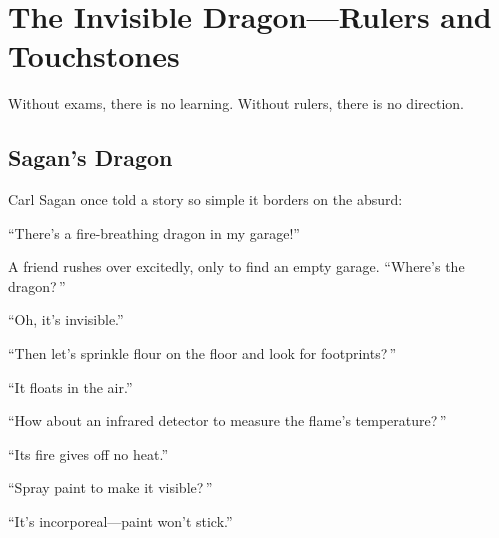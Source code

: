 

\chapter{The Invisible Dragon---Rulers and Touchstones}

\begin{myquote}
Without exams, there is no learning. Without rulers, there is no direction.
\end{myquote}

\section{Sagan's Dragon}

Carl Sagan once told a story so simple it borders on the absurd:

\begin{myquote}
``There's a fire-breathing dragon in my garage!''

A friend rushes over excitedly, only to find an empty garage. ``Where's the dragon?\,''

``Oh, it's invisible.''

``Then let's sprinkle flour on the floor and look for footprints?\,''

``It floats in the air.''

``How about an infrared detector to measure the flame's temperature?\,''

``Its fire gives off no heat.''

``Spray paint to make it visible?\,''

``It's incorporeal---paint won't stick.''
\end{myquote}

